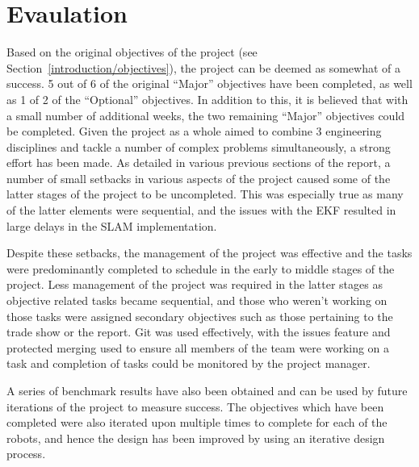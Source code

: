 
\chapter{Evaulation}\label{eval}
Based on the original objectives of the project (see Section~\ref{introduction/objectives}), the project can be deemed as somewhat of a success. 5 out of 6 of 
the original ``Major'' objectives have been completed, as well as 1 of 2 of 
the ``Optional'' objectives. In addition to this, it is believed that with a 
small number of additional weeks, the two remaining ``Major'' objectives could 
be completed. Given the project as a whole aimed to combine 3 engineering 
disciplines and tackle a number of complex problems simultaneously, a strong 
effort has been made. 
As detailed in various previous sections of the report, a number of small setbacks in 
various aspects of the project caused some of the latter stages of the project to be 
uncompleted. This was especially true as many of the latter elements were sequential, 
and the issues with the EKF resulted in large delays in the SLAM implementation. 

Despite these setbacks, the management of the project was effective and the  tasks were predominantly completed to schedule in the early to middle 
stages of the project. Less management of the project was required in the latter 
stages as objective related tasks became sequential, and those who weren't 
working on those tasks were assigned secondary objectives such as those 
pertaining to the trade show or the report. Git was used effectively, with the 
issues feature and protected merging used to ensure all members of the team were 
working on a task and completion of tasks could be monitored by the project 
manager. 

A series of benchmark results have also been obtained and can be used by future 
iterations of the project to measure success. The 
objectives which have been completed were also iterated upon multiple times to 
complete for each of the robots, and hence the design has 
been improved by using an iterative design process. 

